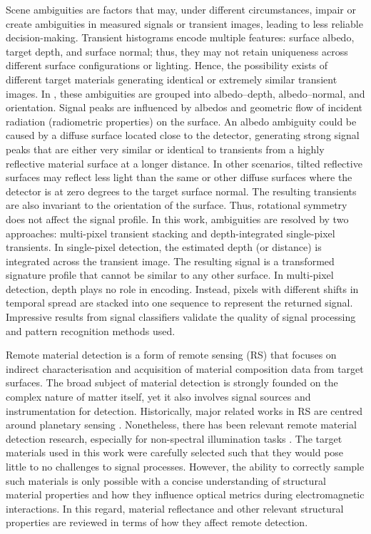 \documentclass[12pt,a4paper,oneside]{report}
\begin{document}
Scene ambiguities are factors that may, under different circumstances, impair or create ambiguities in measured signals or transient images, leading to less reliable decision-making. Transient histograms encode multiple features: surface albedo, target depth, and surface normal; thus, they may not retain uniqueness across different surface configurations or lighting. Hence, the possibility exists of different target materials generating identical or extremely similar transient images. In \cite{jungerman2022}, these ambiguities are grouped into albedo--depth, albedo--normal, and orientation. Signal peaks are influenced by albedos and geometric flow of incident radiation (radiometric properties) on the surface. An albedo ambiguity could be caused by a diffuse surface located close to the detector, generating strong signal peaks that are either very similar or identical to transients from a highly reflective material surface at a longer distance. In other scenarios, tilted reflective surfaces may reflect less light than the same or other diffuse surfaces where the detector is at zero degrees to the target surface normal. The resulting transients are also invariant to the orientation of the surface. Thus, rotational symmetry does not affect the signal profile. In this work, ambiguities are resolved by two approaches: multi-pixel transient stacking and depth-integrated single-pixel transients. In single-pixel detection, the estimated depth (or distance) is integrated across the transient image. The resulting signal is a transformed signature profile that cannot be similar to any other surface. In multi-pixel detection, depth plays no role in encoding. Instead, pixels with different shifts in temporal spread are stacked into one sequence to represent the returned signal. Impressive results from signal classifiers validate the quality of signal processing and pattern recognition methods used.

Remote material detection is a form of remote sensing (RS) that focuses on indirect characterisation and acquisition of material composition data from target surfaces. The broad subject of material detection is strongly founded on the complex nature of matter itself, yet it also involves signal sources and instrumentation for detection. Historically, major related works in RS are centred around planetary sensing \cite{cleveland2009}. Nonetheless, there has been relevant remote material detection research, especially for non-spectral illumination tasks \cite{becker2023,su2016}. The target materials used in this work were carefully selected such that they would pose little to no challenges to signal processes. However, the ability to correctly sample such materials is only possible with a concise understanding of structural material properties and how they influence optical metrics during electromagnetic interactions. In this regard, material reflectance and other relevant structural properties are reviewed in terms of how they affect remote detection.
\end{document}
